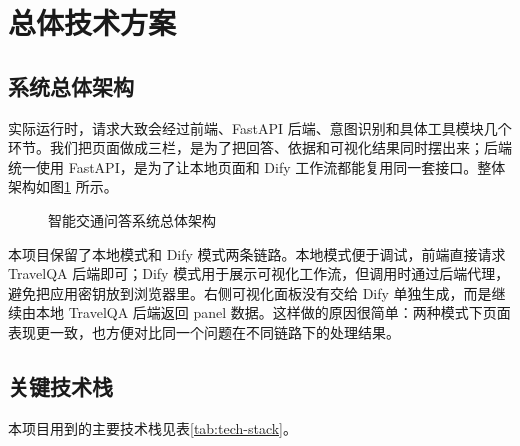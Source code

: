 \documentclass[bwprint]{report}
\begin{document}
\section{总体技术方案}
\subsection{系统总体架构}
实际运行时，请求大致会经过前端、FastAPI 后端、意图识别和具体工具模块几个环节。我们把页面做成三栏，是为了把回答、依据和可视化结果同时摆出来；后端统一使用 FastAPI，是为了让本地页面和 Dify 工作流都能复用同一套接口。整体架构如图\ref{fig:architecture} 所示。

\begin{figure}[H]
    \centering
    \caption{智能交通问答系统总体架构}
    \label{fig:architecture}
\end{figure}

本项目保留了本地模式和 Dify 模式两条链路。本地模式便于调试，前端直接请求 TravelQA 后端即可；Dify 模式用于展示可视化工作流，但调用时通过后端代理，避免把应用密钥放到浏览器里。右侧可视化面板没有交给 Dify 单独生成，而是继续由本地 TravelQA 后端返回 panel 数据。这样做的原因很简单：两种模式下页面表现更一致，也方便对比同一个问题在不同链路下的处理结果。

\subsection{关键技术栈}
本项目用到的主要技术栈见表\ref{tab:tech-stack}。
\end{document}
